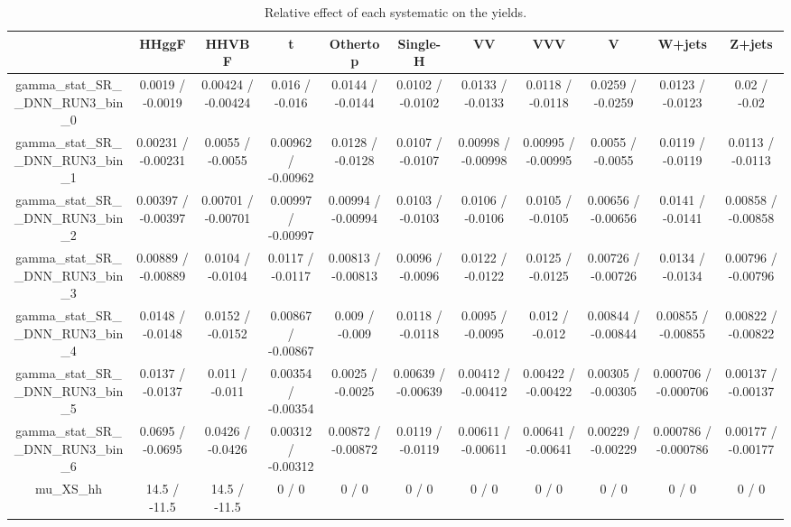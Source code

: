 \documentclass[10pt]{article}
\begin{document}
\begin{table}[htbp]
\begin{center}
\begin{tabular}{|c|c|c|c|c|c|c|c|c|c|c|}
\hline 
      & HHggF      & HHVBF      & t      & Othertop      & Single-H      & VV      & VVV      & V      & W+jets      & Z+jets \\ 
\hline 
  gamma_stat_SR__DNN_RUN3_bin_0 & 0.0019 / -0.0019 & 0.00424 / -0.00424 & 0.016 / -0.016 & 0.0144 / -0.0144 & 0.0102 / -0.0102 & 0.0133 / -0.0133 & 0.0118 / -0.0118 & 0.0259 / -0.0259 & 0.0123 / -0.0123 & 0.02 / -0.02 \\ 
  gamma_stat_SR__DNN_RUN3_bin_1 & 0.00231 / -0.00231 & 0.0055 / -0.0055 & 0.00962 / -0.00962 & 0.0128 / -0.0128 & 0.0107 / -0.0107 & 0.00998 / -0.00998 & 0.00995 / -0.00995 & 0.0055 / -0.0055 & 0.0119 / -0.0119 & 0.0113 / -0.0113 \\ 
  gamma_stat_SR__DNN_RUN3_bin_2 & 0.00397 / -0.00397 & 0.00701 / -0.00701 & 0.00997 / -0.00997 & 0.00994 / -0.00994 & 0.0103 / -0.0103 & 0.0106 / -0.0106 & 0.0105 / -0.0105 & 0.00656 / -0.00656 & 0.0141 / -0.0141 & 0.00858 / -0.00858 \\ 
  gamma_stat_SR__DNN_RUN3_bin_3 & 0.00889 / -0.00889 & 0.0104 / -0.0104 & 0.0117 / -0.0117 & 0.00813 / -0.00813 & 0.0096 / -0.0096 & 0.0122 / -0.0122 & 0.0125 / -0.0125 & 0.00726 / -0.00726 & 0.0134 / -0.0134 & 0.00796 / -0.00796 \\ 
  gamma_stat_SR__DNN_RUN3_bin_4 & 0.0148 / -0.0148 & 0.0152 / -0.0152 & 0.00867 / -0.00867 & 0.009 / -0.009 & 0.0118 / -0.0118 & 0.0095 / -0.0095 & 0.012 / -0.012 & 0.00844 / -0.00844 & 0.00855 / -0.00855 & 0.00822 / -0.00822 \\ 
  gamma_stat_SR__DNN_RUN3_bin_5 & 0.0137 / -0.0137 & 0.011 / -0.011 & 0.00354 / -0.00354 & 0.0025 / -0.0025 & 0.00639 / -0.00639 & 0.00412 / -0.00412 & 0.00422 / -0.00422 & 0.00305 / -0.00305 & 0.000706 / -0.000706 & 0.00137 / -0.00137 \\ 
  gamma_stat_SR__DNN_RUN3_bin_6 & 0.0695 / -0.0695 & 0.0426 / -0.0426 & 0.00312 / -0.00312 & 0.00872 / -0.00872 & 0.0119 / -0.0119 & 0.00611 / -0.00611 & 0.00641 / -0.00641 & 0.00229 / -0.00229 & 0.000786 / -0.000786 & 0.00177 / -0.00177 \\ 
  mu_XS_hh & 14.5 / -11.5 & 14.5 / -11.5 & 0 / 0 & 0 / 0 & 0 / 0 & 0 / 0 & 0 / 0 & 0 / 0 & 0 / 0 & 0 / 0 \\ 
\hline 
\end{tabular} 
\caption{Relative effect of each systematic on the yields.} 
\end{center} 
\end{table} 
\end{document}
